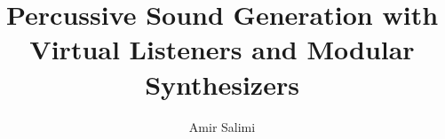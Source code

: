 \documentclass[12pt]{report}
\title{Percussive Sound Generation with Virtual Listeners and Modular Synthesizers}
\author{Amir Salimi}
\newcommand{\onlyinsubfile}[1]{#1}
\newcommand{\notinsubfile}[1]{}
\begin{document}
\renewcommand{\onlyinsubfile}[1]{}
\renewcommand{\notinsubfile}[1]{#1}

\preamblepagenumbering %
\titlepage %



\doublespacing

% 

%

% 
% 

% 

\singlespacing %
               
\tableofcontents
\listoftables  %
\listoffigures %

               
               
\doublespacing
\end{document}
